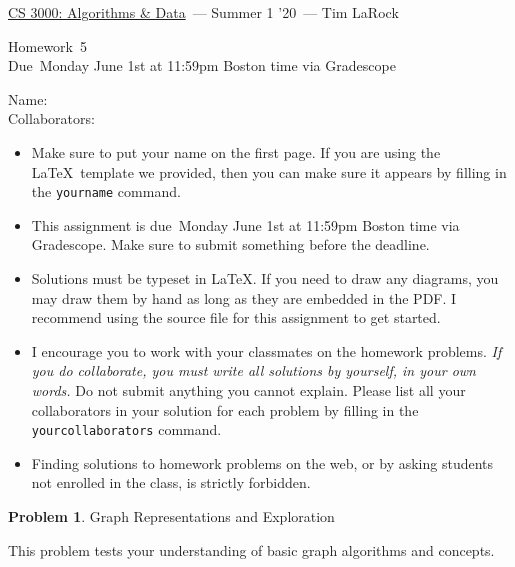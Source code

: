 \documentclass[11pt]{article}
\newcommand{\yourname}{}
\newcommand{\yourcollaborators}{}
\newcommand{\course}{\href{tlarock.github.io/teaching/cs3000/syllabus.html}{CS 3000: Algorithms \& Data}}
\newcommand{\instructor}{Tim LaRock}
\newcommand{\semester}{Summer 1 '20}
\newcommand{\hwnum}{5}
\newcommand{\hwdue}{Monday June 1st at 11:59pm Boston time via Gradescope}
\theoremstyle{definition}
\theoremstyle{theorem}
\newtheorem{prob}{Problem}
\begin{document}
{\Large 
\begin{center} \course\ --- \semester\ --- \instructor \end{center}}
{\large
\vspace{10pt}
\noindent Homework~\hwnum \vspace{2pt}\\
Due~\hwdue}

\bigskip
{\large
\noindent Name: \yourname \vspace{2pt}\\ Collaborators: \yourcollaborators}

\vspace{15pt}
\begin{itemize}
	
	\item Make sure to put your name on the first page.  If you are using the \LaTeX~template we provided, then you can make sure it appears by filling in the \texttt{yourname} command.
	
	\item This assignment is due~\hwdue.  Make sure to submit something before the deadline.
	
	\item Solutions must be typeset in \LaTeX.  If you need to draw any diagrams, you may draw them by hand as long as they are embedded in the PDF.  I recommend using the source file for this assignment to get started.
	
	\item I encourage you to work with your classmates on the homework problems. \emph{If you do collaborate, you must write all solutions by yourself, in your own words.}  Do not submit anything you cannot explain.  Please list all your collaborators in your solution for each problem by filling in the \texttt{yourcollaborators} command.
	
	\item Finding solutions to homework problems on the web, or by asking students not enrolled in the class, is strictly forbidden.
	
\end{itemize}

\newpage
\begin{prob}Graph Representations and Exploration\end{prob}

This problem tests your understanding of basic graph algorithms and concepts.
\end{document}
